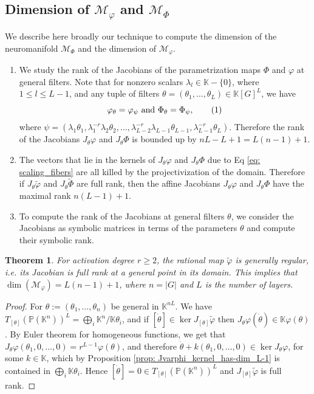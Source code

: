 \documentclass[final]{article}
\newcommand\numberthis{\addtocounter{equation}{1}\tag{\theequation}}
\newcommand{\K}{\mathbb{K}}
\newcommand{\PP}{\mathbb{P}}
\theoremstyle{definition}
\theoremstyle{plain}
\newtheorem{theorem}[definition]{Theorem}
\begin{document}
\subsection{Dimension of $\mathcal{M}_{\varphi}$ and $\mathcal{M}_{\Phi}$}
We describe here broadly our technique to compute the dimension of the neuromanifold $\mathcal{M}_\Phi$ and the dimension of $\mathcal{M}_\varphi$.
\begin{enumerate}
\item We study the rank of the Jacobians of the parametrization maps $\Phi$ and $\varphi$ at general filters.
Note that for nonzero scalars $\lambda_l \in \K-\{0\}$, where $1\leq l \leq L-1$, and any tuple of filters $\theta =(\theta_1, \dots, \theta_L)\in \K[G]^L$, we have 
\[
\varphi_\theta = \varphi_\psi\ \text{and}\ \Phi_\theta = \Phi_\psi, \numberthis \label{eq: scaling_fibers}
\]
where $\psi = (\lambda_1 \theta_1, \lambda_1^{-r }\lambda_2 \theta_2, \dots, \lambda_{L-2}^{-r} \lambda_{L-1}\theta_{L-1}, \lambda_{L-1}^{-r}\theta_L)$. 
Therefore the rank of the Jacobians $J_\theta \varphi$ and $J_\theta \Phi$ is bounded up by $nL - L + 1 = L(n-1)+1$.

\item The vectors that lie in the kernels of $J_\theta \varphi$ and $J_\theta \Phi$ due to Eq \eqref{eq: scaling_fibers} are all killed by the projectivization of the domain. Therefore if $J_\theta \tilde \varphi$ and $J_\theta \tilde \Phi$ are full rank, then  the affine Jacobians $J_\theta \varphi$ and $J_\theta \Phi$ have the  maximal rank $n(L-1)+1$.

\item To compute the rank of the Jacobians at general filters $\theta$, we consider the Jacobians as  symbolic matrices in terms of the parameters $\theta$ and compute their symbolic rank.

\end{enumerate}

\begin{theorem}\label{thm: tilde_varphi_is_regular}
    For activation degree $r\geq 2$, the rational map $\tilde{\varphi}$ is \emph{generally regular,} i.e. its Jacobian is full rank at a general point in its domain. This implies that $\dim(\mathcal{M}_\varphi)=L(n-1)+1$, where $n=|G|$ and $L$ is the number of layers.
\end{theorem}
\begin{proof}

    For $\theta := (\theta_1,\hdots, \theta_n)$ be general in $\K^{nL}$.
    We have $T_{[\theta]} (\PP(\K^n))^L = \bigoplus_{i} \K^{n}/\K\theta_i$, and if $[\dot{\theta}]\in \ker J_{[\theta]} \tilde{\varphi}$ then $J_\theta \varphi(\dot{\theta}) \in \K \varphi(\theta)$.
    By Euler theorem for homogeneous functions, we get that $J_\theta \varphi(\theta_1, 0, \hdots, 0) = r^{L-1} \varphi(\theta)$, and therefore $\dot{\theta} + k(\theta_1, 0, \dots, 0) \in \ker J_\theta \varphi$, for some $k \in \K$, which by Proposition \ref{prop: Jvarphi_kernel_has-dim_L-1} is contained in $\bigoplus_i \K \theta_i$.
    Hence $[\dot{\theta}] = 0 \in T_{[\theta]} (\PP(\K^n))^L$ and $J_{[\theta]} \tilde{\varphi}$ is full rank.
    

   
\end{proof}
\end{document}
